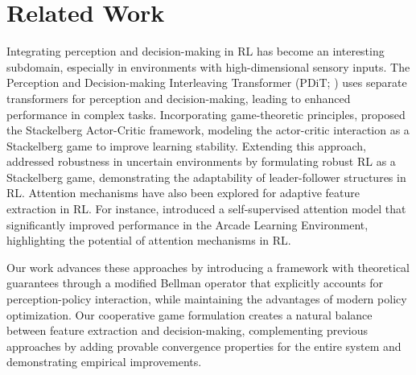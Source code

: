 \section{Related Work}
Integrating perception and decision-making in RL has become an interesting subdomain, especially in environments with high-dimensional sensory inputs. The Perception and Decision-making Interleaving Transformer (PDiT; \cite{mao2024pdit}) uses separate transformers for perception and decision-making, leading to enhanced performance in complex tasks. Incorporating game-theoretic principles, \cite{zheng2022stackelberg} proposed the Stackelberg Actor-Critic framework, modeling the actor-critic interaction as a Stackelberg game to improve learning stability. Extending this approach, \cite{huangrobust2022} addressed robustness in uncertain environments by formulating robust RL as a Stackelberg game, demonstrating the adaptability of leader-follower structures in RL. Attention mechanisms have also been explored for adaptive feature extraction in RL. For instance, \cite{manchin2019reinforcement} introduced a self-supervised attention model that significantly improved performance in the Arcade Learning Environment, highlighting the potential of attention mechanisms in RL.

Our work advances these approaches by introducing a framework with theoretical guarantees through a modified Bellman operator that explicitly accounts for perception-policy interaction, while maintaining the advantages of modern policy optimization. Our cooperative game formulation creates a natural balance between feature extraction and decision-making, complementing previous approaches by adding provable convergence properties for the entire system and demonstrating empirical improvements.